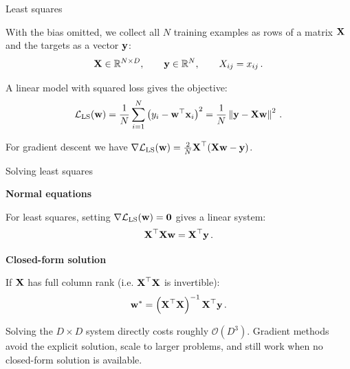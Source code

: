 \begin{frame}{Least squares}

	\justifying
	With the bias omitted, we collect all $N$ training examples as rows of a matrix $\boldsymbol{\mathbf{X}}$ and the  targets as a vector $\boldsymbol{\mathbf{y}}$:
	\begin{equation}
		\boldsymbol{\mathbf{X}}\in\mathbb{R}^{N\times D},
		\qquad \boldsymbol{\mathbf{y}}\in\mathbb{R}^{N},
		\qquad X_{ij}=x_{ij} \,.
	\end{equation}

	\begin{tcolorbox}[nndsblue]
		A linear model with squared loss gives the  objective:
		\begin{equation}
			\mathcal{L}_{\mathrm{LS}}(\boldsymbol{\mathbf{w}})
			= \frac{1}{N}\sum_{i=1}^{N}
			\left(y_i-\boldsymbol{\mathbf{w}}^{\top}\boldsymbol{\mathbf{x}}_i\right)^2
			= \frac{1}{N}\left\lVert\boldsymbol{\mathbf{y}}-\boldsymbol{\mathbf{X}}\boldsymbol{\mathbf{w}}\right\rVert^2 \,.
		\end{equation}
	\end{tcolorbox}

	For gradient descent we have $\nabla \mathcal{L}_{\mathrm{LS}}(\boldsymbol{\mathbf{w}}) = \frac{2}{N}\boldsymbol{\mathbf{X}}^{\top}(\boldsymbol{\mathbf{X}}\boldsymbol{\mathbf{w}}-\boldsymbol{\mathbf{y}})$.

\end{frame}

\begin{frame}{Solving least squares}

	\small
	\begin{tcolorbox}[nndsblue]
		\textbf{\color{darkcerulean}Normal equations}

		For least squares, setting $\nabla \mathcal{L}_{\mathrm{LS}}(\boldsymbol{\mathbf{w}})=\mathbf{0}$ gives a linear system:
		\begin{equation}
			\boldsymbol{\mathbf{X}}^{\top}\boldsymbol{\mathbf{X}}\boldsymbol{\mathbf{w}}=\boldsymbol{\mathbf{X}}^{\top}\boldsymbol{\mathbf{y}} \,.
		\end{equation}
	\end{tcolorbox}

	\begin{tcolorbox}[nndsgreen]
		\textbf{\color{darkgreen}Closed-form solution}

		If $\boldsymbol{\mathbf{X}}$ has full column rank (i.e. $\boldsymbol{\mathbf{X}}^\top\boldsymbol{\mathbf{X}}$ is invertible):
		\begin{equation}
			\boldsymbol{\mathbf{w}}^{*}=\left(\boldsymbol{\mathbf{X}}^{\top}\boldsymbol{\mathbf{X}}\right)^{-1}
			\boldsymbol{\mathbf{X}}^{\top}\boldsymbol{\mathbf{y}} \,.
		\end{equation}
	\end{tcolorbox}

	\begin{tcolorbox}[nndsorange,boxsep=1mm,top=1mm,bottom=1mm]
		Solving the $D\times D$ system directly costs roughly $\mathcal{O}(D^3)$. Gradient methods avoid the explicit solution, scale to larger problems, and still work when no closed-form solution is available.
	\end{tcolorbox}


\end{frame}

